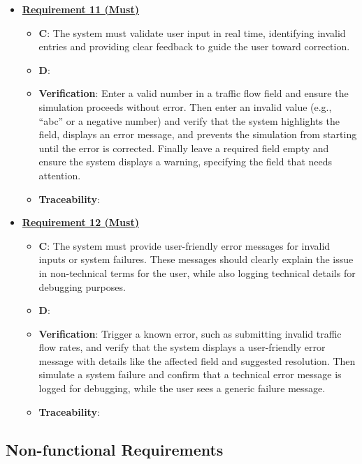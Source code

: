 \documentclass{article}
\begin{document}
\begin{itemize}
    \item \textbf{\underline{Requirement 11 (Must)}}
    \begin{itemize}
        \item \textbf{C}: The system must validate user input in real time, identifying invalid 
            entries and providing clear feedback to guide the user toward correction.
        \item \textbf{D}: 
        \item \textbf{Verification}: Enter a valid number in a traffic flow field and ensure the 
            simulation proceeds without error. Then enter an invalid value (e.g., “abc” or a 
            negative number) and verify that the system highlights the field, displays an error 
            message, and prevents the simulation from starting until the error is corrected. 
            Finally leave a required field empty and ensure the system displays a warning, 
            specifying the field that needs attention.
        \item\textbf{Traceability}: 
    \end{itemize}

    \item \textbf{\underline{Requirement 12 (Must)}}
    \begin{itemize}
        \item \textbf{C}: The system must provide user-friendly error messages for invalid 
            inputs or system failures. These messages should clearly explain the issue in
            non-technical terms for the user, while also logging technical details for debugging 
            purposes.
        \item \textbf{D}: 
        \item \textbf{Verification}: Trigger a known error, such as submitting invalid traffic 
            flow rates, and verify that the system displays a user-friendly error message with
            details like the affected field and suggested resolution. Then simulate a system 
            failure and confirm that a technical error message is logged for debugging, while 
            the user sees a generic failure message.
        \item\textbf{Traceability}: 
    \end{itemize}
\end{itemize}

\subsection{Non-functional Requirements}
\end{document}
